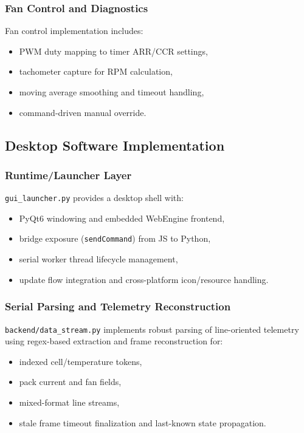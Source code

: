 \documentclass[12pt]{article}
\begin{document}
\subsubsection{Fan Control and Diagnostics}
Fan control implementation includes:
\begin{itemize}[leftmargin=1.2cm]
    \item PWM duty mapping to timer ARR/CCR settings,
    \item tachometer capture for RPM calculation,
    \item moving average smoothing and timeout handling,
    \item command-driven manual override.
\end{itemize}

\subsection{Desktop Software Implementation}
\subsubsection{Runtime/Launcher Layer}
\texttt{gui\_launcher.py} provides a desktop shell with:
\begin{itemize}[leftmargin=1.2cm]
    \item PyQt6 windowing and embedded WebEngine frontend,
    \item bridge exposure (\texttt{sendCommand}) from JS to Python,
    \item serial worker thread lifecycle management,
    \item update flow integration and cross-platform icon/resource handling.
\end{itemize}

\subsubsection{Serial Parsing and Telemetry Reconstruction}
\texttt{backend/data\_stream.py} implements robust parsing of line-oriented telemetry using regex-based extraction and frame reconstruction for:
\begin{itemize}[leftmargin=1.2cm]
    \item indexed cell/temperature tokens,
    \item pack current and fan fields,
    \item mixed-format line streams,
    \item stale frame timeout finalization and last-known state propagation.
\end{itemize}
\end{document}
